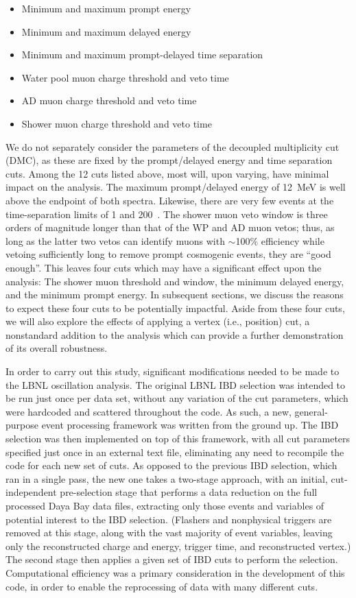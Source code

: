 \documentclass[../thesis.tex]{subfiles}
\begin{document}
\begin{itemize}
\item Minimum and maximum prompt energy
\item Minimum and maximum delayed energy
\item Minimum and maximum prompt-delayed time separation
\item Water pool muon charge threshold and veto time
\item AD muon charge threshold and veto time
\item Shower muon charge threshold and veto time
\end{itemize}

We do not separately consider the parameters of the decoupled multiplicity cut (DMC), as these are fixed by the prompt/delayed energy and time separation cuts. Among the 12 cuts listed above, most will, upon varying, have minimal impact on the analysis. The maximum prompt/delayed energy of 12~MeV is well above the endpoint of both spectra. Likewise, there are very few events at the time-separation limits of 1 and 200~\us. The shower muon veto window is three orders of magnitude longer than that of the WP and AD muon vetos; thus, as long as the latter two vetos can identify muons with $\sim$100\% efficiency while vetoing sufficiently long to remove prompt cosmogenic events, they are ``good enough''. This leaves four cuts which may have a significant effect upon the analysis: The shower muon threshold and window, the minimum delayed energy, and the minimum prompt energy. In subsequent sections, we discuss the reasons to expect these four cuts to be potentially impactful. Aside from these four cuts, we will also explore the effects of applying a vertex (i.e., position) cut, a nonstandard addition to the analysis which can provide a further demonstration of its overall robustness.

In order to carry out this study, significant modifications needed to be made to the LBNL oscillation analysis. The original LBNL IBD selection was intended to be run just once per data set, without any variation of the cut parameters, which were hardcoded and scattered throughout the code. As such, a new, general-purpose event processing framework was written from the ground up. The IBD selection was then implemented on top of this framework, with all cut parameters specified just once in an external text file, eliminating any need to recompile the code for each new set of cuts. As opposed to the previous IBD selection, which ran in a single pass, the new one takes a two-stage approach, with an initial, cut-independent pre-selection stage that performs a data reduction on the full processed Daya Bay data files, extracting only those events and variables of potential interest to the IBD selection. (Flashers and nonphysical triggers are removed at this stage, along with the vast majority of event variables, leaving only the reconstructed charge and energy, trigger time, and reconstructed vertex.) The second stage then applies a given set of IBD cuts to perform the selection. Computational efficiency was a primary consideration in the development of this code, in order to enable the reprocessing of data with many different cuts.
\end{document}
